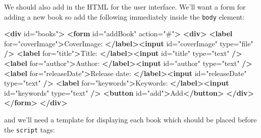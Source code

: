 \documentclass[9pt]{book}
\newenvironment{Shaded}{}{}
\newcommand{\KeywordTok}[1]{\textcolor[rgb]{0.00,0.44,0.13}{\textbf{{#1}}}}
\newcommand{\StringTok}[1]{\textcolor[rgb]{0.25,0.44,0.63}{{#1}}}
\newcommand{\OtherTok}[1]{\textcolor[rgb]{0.00,0.44,0.13}{{#1}}}
\newcommand{\NormalTok}[1]{{#1}}
\begin{document}
We should also add in the HTML for the user interface. We'll want a form
for adding a new book so add the following immediately inside the
\texttt{body} element:

\begin{Shaded}
\begin{Highlighting}[]
\KeywordTok{<div}\OtherTok{ id=}\StringTok{"books"}\KeywordTok{>}
    \KeywordTok{<form}\OtherTok{ id=}\StringTok{"addBook"}\OtherTok{ action=}\StringTok{"#"}\KeywordTok{>}
        \KeywordTok{<div>}
            \KeywordTok{<label}\OtherTok{ for=}\StringTok{"coverImage"}\KeywordTok{>}\NormalTok{CoverImage: }\KeywordTok{</label><input}\OtherTok{ id=}\StringTok{"coverImage"}\OtherTok{ type=}\StringTok{"file"} \KeywordTok{/>}
            \KeywordTok{<label}\OtherTok{ for=}\StringTok{"title"}\KeywordTok{>}\NormalTok{Title: }\KeywordTok{</label><input}\OtherTok{ id=}\StringTok{"title"}\OtherTok{ type=}\StringTok{"text"} \KeywordTok{/>}
            \KeywordTok{<label}\OtherTok{ for=}\StringTok{"author"}\KeywordTok{>}\NormalTok{Author: }\KeywordTok{</label><input}\OtherTok{ id=}\StringTok{"author"}\OtherTok{ type=}\StringTok{"text"} \KeywordTok{/>}
            \KeywordTok{<label}\OtherTok{ for=}\StringTok{"releaseDate"}\KeywordTok{>}\NormalTok{Release date: }\KeywordTok{</label><input}\OtherTok{ id=}\StringTok{"releaseDate"}\OtherTok{ type=}\StringTok{"text"} \KeywordTok{/>}
            \KeywordTok{<label}\OtherTok{ for=}\StringTok{"keywords"}\KeywordTok{>}\NormalTok{Keywords: }\KeywordTok{</label><input}\OtherTok{ id=}\StringTok{"keywords"}\OtherTok{ type=}\StringTok{"text"} \KeywordTok{/>}
            \KeywordTok{<button}\OtherTok{ id=}\StringTok{"add"}\KeywordTok{>}\NormalTok{Add}\KeywordTok{</button>}
        \KeywordTok{</div>}
    \KeywordTok{</form>}
\KeywordTok{</div>}
\end{Highlighting}
\end{Shaded}

and we'll need a template for displaying each book which should be
placed before the \texttt{script} tags:

\begin{Shaded}
\end{Shaded}
\end{document}
